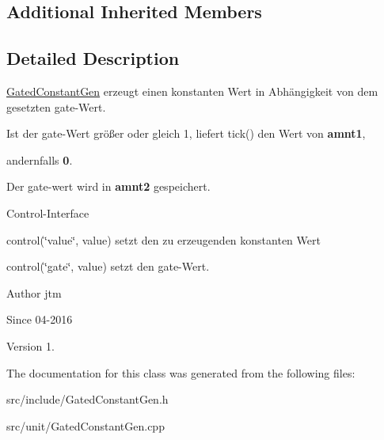 \subsection*{Additional Inherited Members}


\subsection{Detailed Description}
\hyperlink{classunit_1_1GatedConstantGen}{Gated\-Constant\-Gen} erzeugt einen konstanten Wert in Abhängigkeit von dem gesetzten gate-\/\-Wert.


\begin{DoxyItemize}
\item Ist der gate-\/\-Wert größer oder gleich 1, liefert tick() den Wert von {\bfseries amnt1},
\item andernfalls {\bfseries 0}.
\item Der gate-\/wert wird in {\bfseries amnt2} gespeichert.
\end{DoxyItemize}

Control-\/\-Interface


\begin{DoxyItemize}
\item control(\char`\"{}value\char`\"{}, value) setzt den zu erzeugenden konstanten Wert
\item control(\char`\"{}gate\char`\"{}, value) setzt den gate-\/\-Wert.
\end{DoxyItemize}

\begin{DoxyAuthor}{Author}
jtm 
\end{DoxyAuthor}
\begin{DoxySince}{Since}
04-\/2016 
\end{DoxySince}
\begin{DoxyVersion}{Version}
1. 
\end{DoxyVersion}


The documentation for this class was generated from the following files\-:\begin{DoxyCompactItemize}
\item 
src/include/Gated\-Constant\-Gen.\-h\item 
src/unit/Gated\-Constant\-Gen.\-cpp\end{DoxyCompactItemize}
